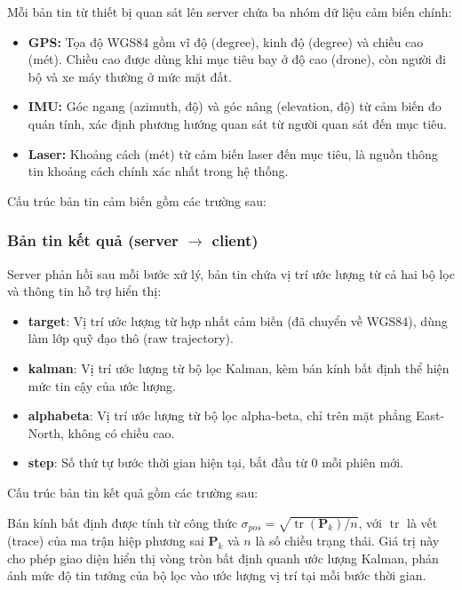\hspace{0.5cm} Mỗi bản tin từ thiết bị quan sát lên server chứa ba nhóm dữ liệu cảm biến chính:

\begin{itemize}
    \item \textbf{GPS:} Tọa độ WGS84 gồm vĩ độ (degree), kinh độ (degree) và chiều cao (mét). Chiều cao được dùng khi mục tiêu bay ở độ cao (drone), còn người đi bộ và xe máy thường ở mức mặt đất.

    \item \textbf{IMU:} Góc ngang (azimuth, độ) và góc nâng (elevation, độ) từ cảm biến đo quán tính, xác định phương hướng quan sát từ người quan sát đến mục tiêu.

    \item \textbf{Laser:} Khoảng cách (mét) từ cảm biến laser đến mục tiêu, là nguồn thông tin khoảng cách chính xác nhất trong hệ thống.
\end{itemize}

Cấu trúc bản tin cảm biến gồm các trường sau:

\subsubsection{Bản tin kết quả (server \texorpdfstring{$\to$}{->} client)}

\hspace{0.5cm} Server phản hồi sau mỗi bước xử lý, bản tin chứa vị trí ước lượng từ cả hai bộ lọc và thông tin hỗ trợ hiển thị:

\begin{itemize}
    \item \textbf{target}: Vị trí ước lượng từ hợp nhất cảm biến (đã chuyển về WGS84), dùng làm lớp quỹ đạo thô (raw trajectory).

    \item \textbf{kalman}: Vị trí ước lượng từ bộ lọc Kalman, kèm bán kính bất định thể hiện mức tin cậy của ước lượng.

    \item \textbf{alphabeta}: Vị trí ước lượng từ bộ lọc alpha-beta, chỉ trên mặt phẳng East-North, không có chiều cao.

    \item \textbf{step}: Số thứ tự bước thời gian hiện tại, bắt đầu từ 0 mỗi phiên mới.
\end{itemize}

Cấu trúc bản tin kết quả gồm các trường sau:

Bán kính bất định được tính từ công thức $\sigma_{pos} = \sqrt{\operatorname{tr}(\mathbf{P}_k)/n}$, với $\operatorname{tr}$ là vết (trace) của ma trận hiệp phương sai $\mathbf{P}_k$ và $n$ là số chiều trạng thái. Giá trị này cho phép giao diện hiển thị vòng tròn bất định quanh ước lượng Kalman, phản ánh mức độ tin tưởng của bộ lọc vào ước lượng vị trí tại mỗi bước thời gian.

